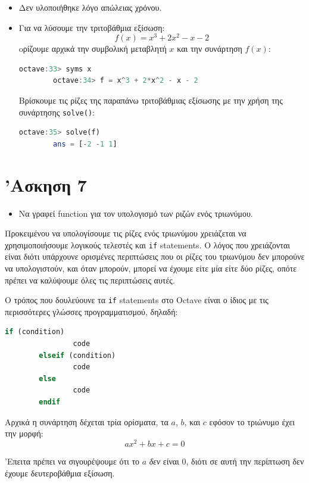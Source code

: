 \documentclass{article}
\begin{document}
\begin{itemize}
\item
Δεν υλοποιήθηκε λόγο απώλειας χρόνου.

\item
Για να λύσουμε την τριτοβάθμια εξίσωση:
\[f(x) = x^3 + 2x^2 - x - 2\]
oρίζουμε αρχικά την συμβολική μεταβλητή $x$ και την συνάρτηση $f(x)$:
\begin{lstlisting}[language=octave]
        octave:33> syms x
        octave:34> f = x^3 + 2*x^2 - x - 2
\end{lstlisting}
Βρίσκουμε τις ρίζες της παραπάνω τριτοβάθμιας εξίσωσης με την χρήση της
συνάρτησης \lstinline{solve()}:
\begin{lstlisting}[language=octave]
        octave:35> solve(f)
        ans = [-2 -1 1]
\end{lstlisting}

\end{itemize}

\section{'Ασκηση 7}

\begin{itemize}
        \item Να γραφεί function για τον υπολογισμό των ριζών ενός τριωνύμου.
\end{itemize}

Προκειμένου να υπολογίσουμε τις ρίζες ενός τριωνύμου χρειάζεται να χρησιμοποιήσουμε
λογικούς τελεστές και \lstinline{if} statements. Ο λόγος που χρειάζονται είναι
διότι υπάρχουνε ορισμένες περιπτώσεις που οι ρίζες του τριωνύμου δεν μπορούνε να
υπολογιστούν, και όταν μπορούν, μπορεί να έχουμε είτε μία είτε δύο ρίζες, οπότε
πρέπει να καλύψουμε όλες τις περιπτώσεις αυτές.

Ο τρόπος που δουλεύουνε τα \lstinline{if} statements στο Octave είναι ο ίδιος με
τις περισσότερες γλώσσες προγραμματισμού, δηλαδή:
\begin{lstlisting}[language=octave]
        if (condition)
                code
        elseif (condition)
                code
        else
                code
        endif
\end{lstlisting}

Αρχικά η συνάρτηση δέχεται τρία ορίσματα, τα $a$, $b$, και $c$ εφόσον το τριώνυμο
έχει την μορφή:
\[ax^2 + bx + c = 0\]

'Επειτα πρέπει να σιγουρέψουμε ότι το $a$ \textit{δεν} είναι 0, διότι σε αυτή την
περίπτωση δεν έχουμε δευτεροβάθμια εξίσωση.
\end{document}
